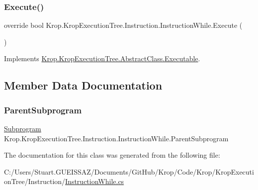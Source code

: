 \subsubsection{\texorpdfstring{Execute()}{Execute()}}
{\footnotesize\ttfamily override bool Krop.\+Krop\+Execution\+Tree.\+Instruction.\+Instruction\+While.\+Execute (\begin{DoxyParamCaption}{ }\end{DoxyParamCaption})\hspace{0.3cm}{\ttfamily [virtual]}}



Implements \mbox{\hyperlink{class_krop_1_1_krop_execution_tree_1_1_abstract_class_1_1_executable_ac32692ce44b5f938a90111ee27e7b684}{Krop.\+Krop\+Execution\+Tree.\+Abstract\+Class.\+Executable}}.



\subsection{Member Data Documentation}
\mbox{\label{class_krop_1_1_krop_execution_tree_1_1_instruction_1_1_instruction_while_ade7724a61c86599bdc632bfccc2363f4}} 
\subsubsection{\texorpdfstring{Parent\+Subprogram}{ParentSubprogram}}
{\footnotesize\ttfamily \mbox{\hyperlink{class_krop_1_1_krop_execution_tree_1_1_subprogram}{Subprogram}} Krop.\+Krop\+Execution\+Tree.\+Instruction.\+Instruction\+While.\+Parent\+Subprogram}



The documentation for this class was generated from the following file\+:\begin{DoxyCompactItemize}
\item 
C\+:/\+Users/\+Stuart.\+G\+U\+E\+I\+S\+S\+A\+Z/\+Documents/\+Git\+Hub/\+Krop/\+Code/\+Krop/\+Krop\+Execution\+Tree/\+Instruction/\mbox{\hyperlink{_instruction_while_8cs}{Instruction\+While.\+cs}}\end{DoxyCompactItemize}
